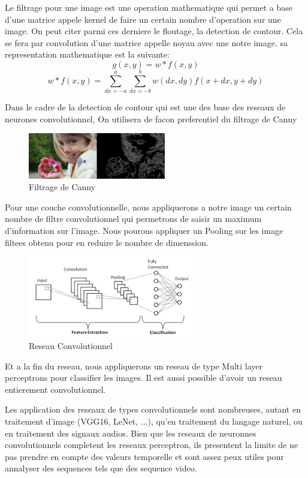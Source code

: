 \documentclass[twoside,twocolumn]{article}
\begin{document}
Le filtrage pour une image est une operation mathematique qui permet a base d'une matrice appele kernel de faire un certain nombre d'operation sur une image. On peut citer parmi ces derniere le floutage,
la detection de contour. Cela se fera par convolution d'une matrice appelle noyau avec une notre image. sa representation mathematique est la suivante:
\[g(x,y) = w*f(x,y)\]
\[w*f(x,y) = \sum_{dx=-a}^{a} \sum_{dx=-b}^{b} w(dx,dy)f(x+dx,y+dy)\]

Dans le cadre de la detection de contour qui est une des base des reseaux de neurones convolutionnel, On utilisera de facon preferentiel du filtrage de Canny \cite{Canny1}

\begin{figure}[h]
  \centering
  \includegraphics[width=60mm]{canny.png}
  \caption{Filtrage de Canny}
  \label{CannyOutput}
  \end{figure}

Pour une couche convolutionnelle, nous appliquerons a notre image un certain nombre de filtre convolutionnel qui permetrons de saisir un maximum d'information sur l'image. Nous pourons appliquer un Pooling sur les image filtees obtenu pour en reduire le nombre de dimenssion.

\begin{figure}[h]
  \centering
  \includegraphics[width=72mm]{convneural.png}
  \caption{Reseau Convolutionnel}
  \label{ConvNet}
\end{figure}
Et a la fin du reseau, nous appliquerons un reseau de type Multi layer perceptrons pour classifier les images. Il est aussi possible d'avoir un reseau entierement convolutionnel.

Les application des reseaux de types convolutionnels sont nombreuses, autant en traitement d'image \cite{Browne1} (VGG16, LeNet, ...), qu'en traitement du langage naturel\cite{8666928}, ou en traitement des signaux audios\cite{Gama_2019}. 
Bien que les reseaux de neuronnes convolutionnels completent les reseaux perceptron, ils presentent la limite de ne pas prendre en compte des valeurs temporelle et sont assez peux utiles pour annalyser des sequences tels que des sequence video.
\end{document}
